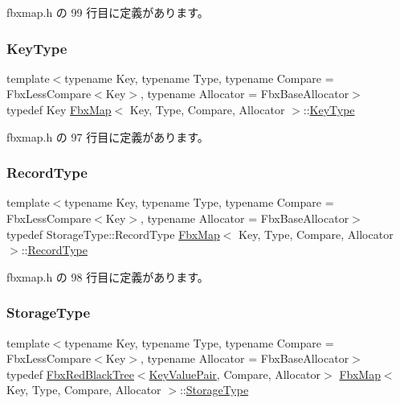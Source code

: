  fbxmap.\+h の 99 行目に定義があります。

\mbox{\label{class_fbx_map_ad8392c83b6f8eeb9e0706bcc8674270a}} 
\subsubsection{\texorpdfstring{Key\+Type}{KeyType}}
{\footnotesize\ttfamily template$<$typename Key, typename Type, typename Compare = Fbx\+Less\+Compare$<$\+Key$>$, typename Allocator = Fbx\+Base\+Allocator$>$ \\
typedef Key \hyperlink{class_fbx_map}{Fbx\+Map}$<$ Key, Type, Compare, Allocator $>$\+::\hyperlink{class_fbx_map_ad8392c83b6f8eeb9e0706bcc8674270a}{Key\+Type}}



 fbxmap.\+h の 97 行目に定義があります。

\mbox{\label{class_fbx_map_af8fc887461b3bf29f41aa36d15ddb54f}} 
\subsubsection{\texorpdfstring{Record\+Type}{RecordType}}
{\footnotesize\ttfamily template$<$typename Key, typename Type, typename Compare = Fbx\+Less\+Compare$<$\+Key$>$, typename Allocator = Fbx\+Base\+Allocator$>$ \\
typedef Storage\+Type\+::\+Record\+Type \hyperlink{class_fbx_map}{Fbx\+Map}$<$ Key, Type, Compare, Allocator $>$\+::\hyperlink{class_fbx_map_af8fc887461b3bf29f41aa36d15ddb54f}{Record\+Type}}



 fbxmap.\+h の 98 行目に定義があります。

\mbox{\label{class_fbx_map_ad7e4fa113e167dfd44f52993fa302c2d}} 
\subsubsection{\texorpdfstring{Storage\+Type}{StorageType}}
{\footnotesize\ttfamily template$<$typename Key, typename Type, typename Compare = Fbx\+Less\+Compare$<$\+Key$>$, typename Allocator = Fbx\+Base\+Allocator$>$ \\
typedef \hyperlink{class_fbx_red_black_tree}{Fbx\+Red\+Black\+Tree}$<$\hyperlink{class_fbx_map_1_1_key_value_pair}{Key\+Value\+Pair}, Compare, Allocator$>$ \hyperlink{class_fbx_map}{Fbx\+Map}$<$ Key, Type, Compare, Allocator $>$\+::\hyperlink{class_fbx_map_ad7e4fa113e167dfd44f52993fa302c2d}{Storage\+Type}\hspace{0.3cm}{\ttfamily [protected]}}



